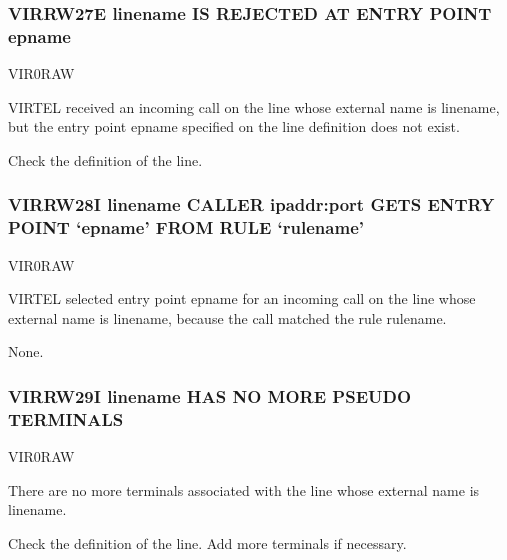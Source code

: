\documentclass[letterpaper,10pt,english]{sphinxmanual}
\begin{document}
\subsubsection{VIRRW27E linename IS REJECTED AT ENTRY POINT epname}
\label{\detokenize{messages:virrw27e-linename-is-rejected-at-entry-point-epname}}\begin{description}
\sphinxAtStartPar
VIR0RAW

\sphinxAtStartPar
VIRTEL received an incoming call on the line whose external name is linename, but the entry point epname specified on the line definition does not exist.

\sphinxAtStartPar
Check the definition of the line.

\end{description}


\subsubsection{VIRRW28I linename CALLER ipaddr:port GETS ENTRY POINT ‘epname’ FROM RULE ‘rulename’}
\label{\detokenize{messages:virrw28i-linename-caller-ipaddr-port-gets-entry-point-epname-from-rule-rulename}}\begin{description}
\sphinxAtStartPar
VIR0RAW

\sphinxAtStartPar
VIRTEL selected entry point epname for an incoming call on the line whose external name is linename, because the call matched the rule rulename.

\sphinxAtStartPar
None.

\end{description}


\subsubsection{VIRRW29I linename HAS NO MORE PSEUDO TERMINALS}
\label{\detokenize{messages:virrw29i-linename-has-no-more-pseudo-terminals}}\begin{description}
\sphinxAtStartPar
VIR0RAW

\sphinxAtStartPar
There are no more terminals associated with the line whose external name is linename.

\sphinxAtStartPar
Check the definition of the line. Add more terminals if necessary.

\end{description}
\end{document}
